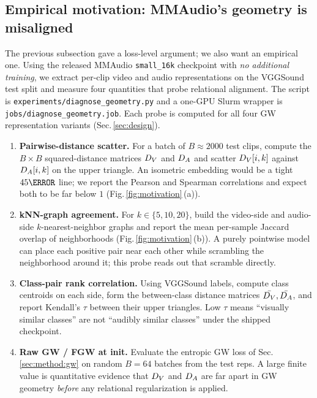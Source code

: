 \subsection{Empirical motivation: MMAudio's geometry is misaligned}
\label{sec:intro:motivation}
The previous subsection gave a loss-level argument; we also want
an empirical one. Using the released MMAudio \texttt{small\_16k}
checkpoint with \emph{no additional training}, we extract
per-clip video and audio representations on the VGGSound test
split and measure four quantities that probe relational
alignment. The script is
\texttt{experiments/diagnose\_geometry.py} and a one-GPU Slurm
wrapper is \texttt{jobs/diagnose\_geometry.job}. Each probe is
computed for all four GW representation variants
(Sec.\,\ref{sec:design}).

\begin{enumerate}[leftmargin=*,topsep=2pt]
  \item \textbf{Pairwise-distance scatter.} For a batch of
    $B{\approx}2000$ test clips, compute the
    $B \times B$ squared-distance matrices $D_{V}$ and $D_{A}$ and
    scatter $D_{V}[i,k]$ against $D_{A}[i,k]$ on the upper
    triangle. An isometric embedding would be a tight
    $45\degree$ line; we report the Pearson and Spearman
    correlations and expect both to be far below $1$
    (Fig.\,\ref{fig:motivation}\,(a)).
  \item \textbf{kNN-graph agreement.} For
    $k \in \{5, 10, 20\}$, build the video-side and audio-side
    $k$-nearest-neighbor graphs and report the mean per-sample
    Jaccard overlap of neighborhoods
    (Fig.\,\ref{fig:motivation}\,(b)). A purely pointwise model
    can place each positive pair near each other while scrambling
    the neighborhood around it; this probe reads out that
    scramble directly.
  \item \textbf{Class-pair rank correlation.} Using VGGSound
    labels, compute class centroids on each side, form the
    between-class distance matrices $\bar{D_{V}}, \bar{D_{A}}$, and report
    Kendall's $\tau$ between their upper triangles. Low $\tau$
    means ``visually similar classes'' are not ``audibly similar
    classes'' under the shipped checkpoint.
  \item \textbf{Raw GW / FGW at init.} Evaluate the entropic
    GW loss of Sec.\,\ref{sec:method:gw} on random
    $B{=}64$ batches from the test reps. A large finite value
    is quantitative evidence that $D_{V}$ and $D_{A}$ are far apart
    in GW geometry \emph{before} any relational regularization
    is applied.
\end{enumerate}

